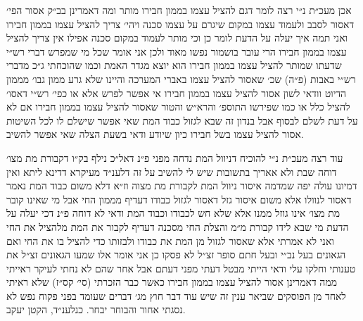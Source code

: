 \documentclass[12pt, openany]{book}
\begin{document}
\begin{multicols}{2}
אכן מעכ״ת נ״י רצה לומר דגם להציל עצמו בממון חבירו מותר ומה דאמרינן בב״ק אסור הפי׳ דאסור לסבב ולעמוד עצמו במקום שיגרם על עצמו סכנה ויהי׳ צריך להציל עצמו בממון חבירו ואני תמה איך יעלה על הדעת לומר כן וכי מותר לעמוד במקום סכנה אפילו אין צריך להציל עצמו בממון חבירו הרי עובר בושמור נפשו מאוד ולכן אני אומר שכל מי שמפרש דברי רש״י שדעתו שמותר להציל עצמו בממון חבירו הוא יוצא מגדר האמת וכמו שהוכחתי ג״כ מדברי רש״י באבות (פ״ה) שכ׳ שאסור להציל עצמו באברי המערכה והיינו שלא גרע ממון גבו׳ מממון הדיוט וודאי לשון אסור להציל עצמו בממון חבירו אי אפשר לפרש אלא או כפי׳ רש״י דאסו׳ להציל כלל או כמו שפירשו התוספ׳ והרא״ש והטור שאסור להציל עצמו בממון חבירו אם לא על דעת לשלם לבסוף אבל בנדון זה שבא לגזול כבוד המת שאי אפשר שישלם לו לכל השיטות אסור להציל עצמו בשל חבירו כיון שיודע ודאי בשעת הצלה שאי אפשר להשיב.\\\vspace{0pt}

עוד רצה מעכ״ת נ״י להוכיח דניוול המת נדחה מפני פ״נ דאל״כ נילף בק״ו דקבורת מת מצו׳ דוחה שבת ולא אאריך בתשובות שיש לי להשיב על זה דלענ״ד מעיקרא דדינא ליתא ואין דמיונו עולה יפה שמדמה איסור ניוול המת לקבורת מת מצוה וז״א דלא משום כבוד המת נאמר דאסור לנוולו אלא משום איסור גזל דאסור לגזול כבודו דעדיף מממון החי אבל מי שאינו קובר מת מצו׳ אינו גוזל ממנו אלא שלא חש לכבודו וכבוד המת ודאי לא דוחה פ״נ דכי יעלה על הדעת מי שבא לידו קבורת מ״מ והצלת החי מסכנה דעדיף לקבור את המת מלהציל את החי ואני לא אמרתי אלא שאסור לגזול מן המת את כבודו ולבזותו כדי להציל בו את החי ואם הגאונים בעל נב״י ובעל חתם סופר זצ״ל לא פסקו כן אני אומר אלו שמעו הגאונים זצ״ל את טענותי וחלקו עלי ודאי הייתי מבטל דעתי מפני דעתם אבל אחר שהם לא נחתי לעיקר ראייתי ממה דאמרינן אסור להציל עצמו בממון חבירו כאשר כבר הזכרתי (סי׳ קס״ז) שלא ראיתי לאחד מן הפוסקים שביאר ענין זה שיש עוד דבר חוץ מג׳ דברים שעומד בפני פקוח נפש לא נסגתי אחור והבוחר יבחר. כנלענ״ד, הקטן יעקב.\\\vspace{0pt}

\end{multicols}\newpage
\end{document}
